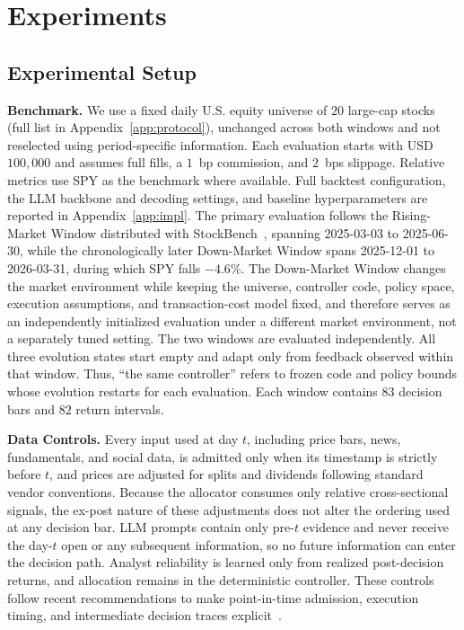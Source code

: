 \documentclass[letterpaper]{article}
\begin{document}
\section{Experiments}

\subsection{Experimental Setup}

\textbf{Benchmark.}\quad
We use a fixed daily U.S. equity universe of $20$ large-cap stocks
(full list in Appendix~\ref{app:protocol}), unchanged across both
windows and not reselected using period-specific information. Each
evaluation starts with USD $100{,}000$ and assumes full fills, a
$1$~bp commission, and $2$~bps slippage. Relative metrics use SPY as
the benchmark where available. Full backtest configuration, the LLM
backbone and decoding settings, and baseline hyperparameters are
reported in Appendix~\ref{app:impl}. The primary evaluation follows
the Rising-Market Window distributed with
StockBench~\citep{chen2025stockbench}, spanning 2025-03-03 to
2025-06-30, while the chronologically later Down-Market Window spans
2025-12-01 to 2026-03-31, during which SPY falls $-4.6\%$. The
Down-Market Window changes the market environment while keeping the
universe,
controller code, policy space, execution assumptions, and transaction-cost
model fixed, and therefore serves as an independently initialized evaluation
under a different market environment, not a separately tuned setting.
The two windows are evaluated independently. All three evolution states
start empty and adapt only from feedback observed within that window. Thus,
``the same controller'' refers to frozen code and policy bounds whose
evolution restarts for each evaluation. Each window
contains $83$ decision bars and $82$ return intervals.

\textbf{Data Controls.}\quad
Every input used at day $t$, including price bars, news, fundamentals, and
social data, is admitted only when its timestamp is strictly before $t$, and
prices are adjusted for splits and dividends following standard vendor
conventions. Because the allocator consumes only relative
cross-sectional signals, the ex-post nature of these adjustments does not
alter the ordering used at any decision bar. LLM prompts contain only
pre-$t$ evidence and never receive the day-$t$ open or any subsequent
information, so no future information can enter the decision path. Analyst
reliability is learned only from realized post-decision returns, and
allocation remains in the deterministic controller. These controls follow
recent recommendations to make point-in-time admission, execution timing,
and intermediate decision traces
explicit~\citep{yao2026execution,qu2026clqt,li2026nextfund}.
\end{document}
